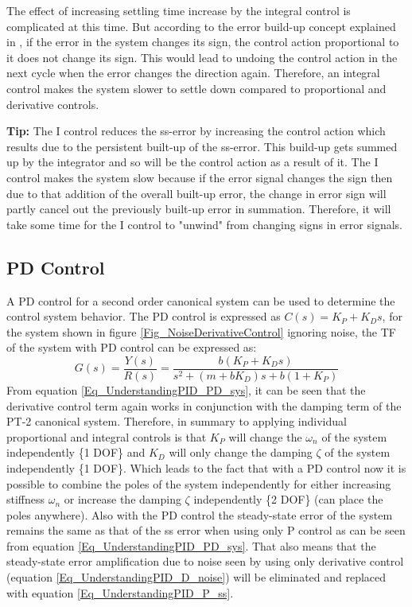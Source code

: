 The effect of increasing settling time increase by the integral control is complicated at this time. But according to the error build-up concept explained in \cite[t.1:01:00]{RickHill_14}, if the error in the system changes its sign, the control action proportional to it does not change its sign. This would lead to undoing the control action in the next cycle when the error changes the direction again. Therefore, an integral control makes the system slower to settle down compared to proportional and derivative controls.

\textbf{Tip: }The I control reduces the ss-error by increasing the control action which results due to the persistent built-up of the ss-error. This build-up gets summed up by the integrator and so will be the control action as a result of it. The I control makes the system slow because if the error signal changes the sign then due to that addition of the overall built-up error, the change in error sign will partly cancel out the previously built-up error in summation. Therefore, it will take some time for the I control to "unwind" from changing signs in error signals.

\subsection{PD Control}

A PD control for a second order canonical system can be used to determine the control system behavior. The PD control is expressed as $C(s) = K_P + K_D s$, for the system shown in figure \ref{Fig_NoiseDerivativeControl} ignoring noise, the TF of the system with PD control can be expressed as:
\begin{equation} \label{Eq_UnderstandingPID_PD_sys}
	G(s) = \frac{Y(s)}{R(s)} = \frac{b(K_P + K_D s)}{s^2 + (m+b K_D)s + b(1 + K_P)}
\end{equation}
From equation \ref{Eq_UnderstandingPID_PD_sys}, it can be seen that the derivative control term again works in conjunction with the damping term of the PT-2 canonical system. Therefore, in summary to applying individual proportional and integral controls is that $K_P$ will change the $\omega_{n}$ of the system independently \{1 DOF\} and $K_D$ will only change the damping $\zeta$ of the system independently \{1 DOF\}. Which leads to the fact that with a PD control now it is possible to combine the poles of the system independently for either increasing stiffness $\omega_{n}$ or increase the damping $\zeta$ independently \{2 DOF\} (can place the poles anywhere). Also with the PD control the steady-state error of the system remains the same as that of the ss error when using only P control as can be seen from equation \eqref{Eq_UnderstandingPID_PD_sys}. That also means that the steady-state error amplification due to noise seen by using only derivative control (equation \eqref{Eq_UnderstandingPID_D_noise}) will be eliminated and replaced with equation \eqref{Eq_UnderstandingPID_P_ss}.

